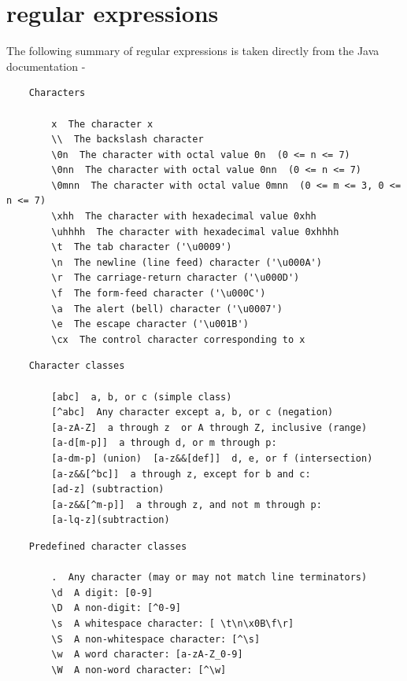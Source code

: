 \pagebreak

\chapter{regular expressions}\label{chap:regexp}

    The following summary of regular expressions is taken directly from the Java
    documentation -

    \begin{verbatim}
    Characters

        x  The character x
        \\  The backslash character
        \0n  The character with octal value 0n  (0 <= n <= 7)
        \0nn  The character with octal value 0nn  (0 <= n <= 7)
        \0mnn  The character with octal value 0mnn  (0 <= m <= 3, 0 <= n <= 7)
        \xhh  The character with hexadecimal value 0xhh
        \uhhhh  The character with hexadecimal value 0xhhhh
        \t  The tab character ('\u0009')
        \n  The newline (line feed) character ('\u000A')
        \r  The carriage-return character ('\u000D')
        \f  The form-feed character ('\u000C')
        \a  The alert (bell) character ('\u0007')
        \e  The escape character ('\u001B')
        \cx  The control character corresponding to x
    \end{verbatim}

    \begin{verbatim}
    Character classes

        [abc]  a, b, or c (simple class)
        [^abc]  Any character except a, b, or c (negation)
        [a-zA-Z]  a through z  or A through Z, inclusive (range)
        [a-d[m-p]]  a through d, or m through p:
        [a-dm-p] (union)  [a-z&&[def]]  d, e, or f (intersection)
        [a-z&&[^bc]]  a through z, except for b and c:
        [ad-z] (subtraction)
        [a-z&&[^m-p]]  a through z, and not m through p:
        [a-lq-z](subtraction)
    \end{verbatim}

    \begin{verbatim}
    Predefined character classes

        .  Any character (may or may not match line terminators)
        \d  A digit: [0-9]
        \D  A non-digit: [^0-9]
        \s  A whitespace character: [ \t\n\x0B\f\r]
        \S  A non-whitespace character: [^\s]
        \w  A word character: [a-zA-Z_0-9]
        \W  A non-word character: [^\w]     
    \end{verbatim}

